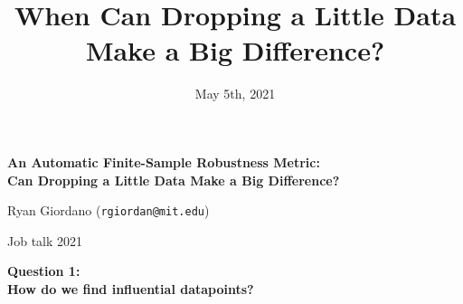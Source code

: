 \documentclass[10pt]{beamer}
\title{When Can Dropping a Little Data Make a Big Difference?}
\author{}
\date{May 5th, 2021}
\begin{document}

\begin{frame}

\begin{center}
\large
\textbf{
An Automatic Finite-Sample Robustness Metric:
\\Can Dropping a Little Data Make a Big Difference?}
\end{center}

\hrulefill


Ryan Giordano (\texttt{rgiordan@mit.edu})

Job talk 2021

\end{frame}




\begin{frame}{}

{\Large \textbf{Question 1:} \\ \vspace{0.5em}
\textbf{How do we find influential datapoints?}}

\end{frame}


\end{document}
